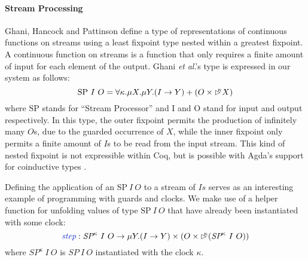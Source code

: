\documentclass[natbib]{sigplanconf}
\newcommand{\tyname}[1]{\textrm{#1}}
\newcommand{\ident}[1]{\textit{#1}}
\newcommand{\defn}[1]{\textcolor{defnd}{\ident{#1}}}
\newcommand{\delay}[1]{\mathord{\rhd\kern-0.4em^{#1}}}
\newcommand{\etal}{\textit{et} \textit{al}.}
\begin{document}
\paragraph{Stream Processing}

Ghani, Hancock and Pattinson \cite{ghani09representations} define a
type of representations of continuous functions on streams using a
least fixpoint type nested within a greatest fixpoint. A continuous
function on streams is a function that only requires a finite amount
of input for each element of the output. Ghani \etal's type is
expressed in our system as follows:
\begin{displaymath}
  \tyname{SP}~I~O = \forall \kappa. \mu X. \mu Y. (I \to Y) + (O \times \delay\kappa X)
\end{displaymath}
where $\tyname{SP}$ stands for ``Stream Processor'' and $\tyname{I}$
and $\tyname{O}$ stand for input and output respectively. In this
type, the outer fixpoint permits the production of infinitely many
$O$s, due to the guarded occurrence of $X$, while the inner fixpoint
only permits a finite amount of $I$s to be read from the input
stream. This kind of nested fixpoint is not expressible within Coq,
but is possible with Agda's support for coinductive types
\cite{danielsson09mixing}.

Defining the application of an $\tyname{SP}~I~O$ to a stream of $Is$
serves as an interesting example of programming with guards and
clocks. We make use of a helper function for unfolding values of type
$\tyname{SP}~I~O$ that have already been instantiated with some clock:
\begin{displaymath}
  \defn{step} : \ident{SP}^\kappa~I~O \to \mu Y. (I \to Y) \times (O \times \delay\kappa(\ident{SP}^\kappa~I~O))
\end{displaymath}
where $\ident{SP}^\kappa~I~O$ is $\ident{SP}~I~O$ instantiated with
the clock $\kappa$.
\end{document}
